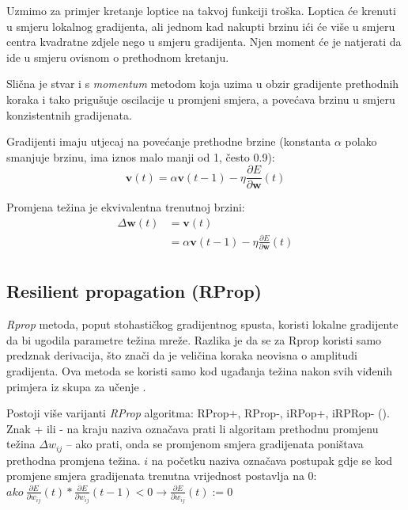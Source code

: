 \documentclass[times, utf8, diplomski, numeric]{fer}
\begin{document}
Uzmimo za primjer kretanje loptice na takvoj funkciji troška. Loptica će krenuti u smjeru lokalnog gradijenta, ali jednom kad nakupti brzinu ići će više u smjeru centra kvadratne zdjele nego u smjeru gradijenta. Njen moment će je natjerati da ide u smjeru ovisnom o prethodnom kretanju.

Slična je stvar i s \emph{momentum} metodom koja uzima u obzir gradijente prethodnih koraka i tako prigušuje oscilacije u promjeni smjera, a povećava brzinu u smjeru konzistentnih gradijenata.

Gradijenti imaju utjecaj na povećanje prethodne brzine (konstanta $\alpha$ polako smanjuje brzinu, ima iznos malo manji od 1, često 0.9):
\begin{equation}
\boldsymbol{v}(t) = \alpha \boldsymbol{v}(t-1) - \eta \frac{\partial E}{\partial \boldsymbol{w}}(t)
\end{equation}

Promjena težina je ekvivalentna trenutnoj brzini:
\begin{equation}
\begin{split}
	\Delta \boldsymbol{w}(t) &= \boldsymbol{v}(t) \\
		&= \alpha \boldsymbol{v}(t-1) - \eta \frac{\partial E}{\partial \boldsymbol{w}}(t) \\
\end{split}
\end{equation}

\subsection{Resilient propagation (RProp)}

\textit{Rprop} metoda, poput stohastičkog gradijentnog spusta, koristi lokalne gradijente da bi ugodila parametre težina mreže. Razlika je da se za Rprop koristi samo predznak  derivacija, što znači da je veličina koraka neovisna o amplitudi gradijenta. Ova metoda se koristi samo kod ugađanja težina nakon svih viđenih primjera iz skupa za učenje .

Postoji više varijanti \textit{RProp} algoritma: RProp+, RProp-, iRPop+, iRPRop- (\cite{Igel00}).
Znak + ili - na kraju naziva označava prati li algoritam prethodnu promjenu težina $\Delta w_{ij}$  -- ako prati, onda se promjenom smjera gradijenata poništava prethodna promjena težina. $i$ na početku naziva označava postupak gdje se kod promjene smjera gradijenata trenutna vrijednost postavlja na 0: $ako \ \frac{\partial E}{\partial w_{ij}}(t) * \frac{\partial E}{\partial w_{ij}}(t-1) < 0 \rightarrow \frac{\partial E}{\partial w_{ij}}(t) := 0$
\end{document}
